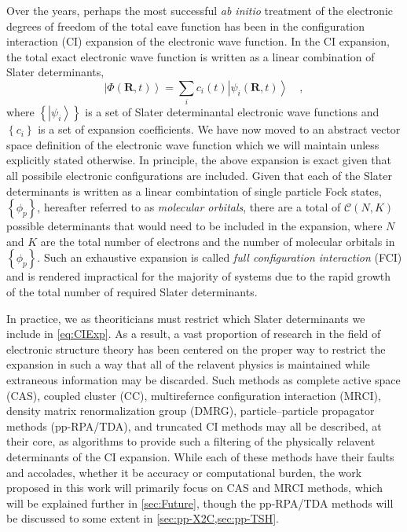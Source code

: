 \documentclass[12pt]{article}
\newcommand{\ket}[1]{\left\vert #1 \right\rangle}         %
\newcommand*\vc[1]{\boldsymbol{#1}}
\begin{document}
Over the years, perhaps the most successful \emph{ab initio} treatment of the
electronic degrees of freedom of the total eave function has been in the
configuration interaction (CI) expansion of the electronic wave function. In the
CI expansion, the total exact electronic wave function is written as a linear
combination of Slater determinants,
\begin{equation}
\ket{\Phi (\vc{R},t)} = \sum_i c_i(t) \ket{\psi_i (\vc{R},t)}
\quad ,
\label{eq:CIExp}
\end{equation}
where $\left\lbrace\ket{\psi_i}\right\rbrace$ is a set of Slater determinantal
electronic wave functions and $\left\lbrace c_i \right\rbrace$ is a set of
expansion coefficients. We have now moved to an abstract vector space definition
of the electronic wave function which we will maintain unless explicitly stated
otherwise. In principle, the above expansion is exact given that all possibile
electronic configurations are included. Given that each of the Slater
determinants is written as a linear combintation of single particle Fock states,
$\left\lbrace \phi_p \right\rbrace$, hereafter referred to as \emph{molecular
orbitals}, there are a total of $\mathcal{C}(N,K)$ possible determinants that
would need to be included in the expansion, where $N$ and $K$ are the total
number of electrons and the number of molecular orbitals in 
$\left\lbrace \phi_p \right\rbrace$. Such an exhaustive expansion is called
\emph{full configuration interaction} (FCI) and is rendered impractical for the
majority of systems due to the rapid growth of the total number of required
Slater determinants.

In practice, we as theoriticians must restrict which Slater determinants we
include in \cref{eq:CIExp}. As a result, a vast proportion of research in the
field of electronic structure theory has been centered on the proper way to
restrict the expansion in such a way that all of the relavent physics is
maintained while extraneous information may be discarded. Such methods as
complete active space (CAS), coupled cluster (CC), multirefernce configuration
interaction (MRCI), density matrix renormalization group (DMRG),
particle--particle propagator methods (pp-RPA/TDA), and truncated CI methods may
all be described, at their core, as algorithms to provide such a filtering of
the physically relavent determinants of the CI expansion. While each of these
methods have their faults and accolades, whether it be accuracy or computational
burden, the work proposed in this work will primarily focus on CAS and MRCI
methods, which will be explained further in \cref{sec:Future}, though the
pp-RPA/TDA methods will be discussed to some extent in 
\cref{sec:pp-X2C,sec:pp-TSH}.
\end{document}
